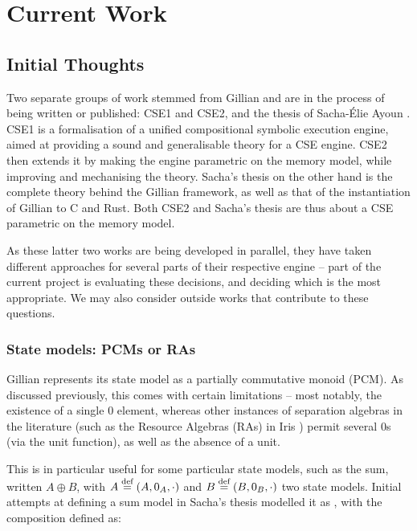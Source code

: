 \chapter{Current Work}

\section{Initial Thoughts}
\label{sec:initial-thoughts}

Two separate groups of work stemmed from Gillian \cite{gillian0, gillian1, gillian2} and are in the process of being written or published: CSE1 \cite{cse1} and CSE2, and the thesis of Sacha-Élie Ayoun \cite{sacha-phd}. CSE1 is a formalisation of a unified compositional symbolic execution engine, aimed at providing a sound and generalisable theory for a CSE engine. CSE2 then extends it by making the engine parametric on the memory model, while improving and mechanising the theory. Sacha's thesis on the other hand is the complete theory behind the Gillian framework, as well as that of the instantiation of Gillian to C and Rust. Both CSE2 and Sacha's thesis are thus about a CSE parametric on the memory model.

As these latter two works are being developed in parallel, they have taken different approaches for several parts of their respective engine -- part of the current project is evaluating these decisions, and deciding which is the most appropriate. We may also consider outside works that contribute to these questions.

\subsection{State models: PCMs or RAs}
\label{sec:thoughts-state-models}

Gillian represents its state model as a partially commutative monoid (PCM). As discussed previously, this comes with certain limitations -- most notably, the existence of a single $0$ element, whereas other instances of separation algebras in the literature (such as the Resource Algebras (RAs) in Iris \cite{iris}) permit several $0$s (via the unit function), as well as the absence of a unit.

This is in particular useful for some particular state models, such as the sum, written $A \oplus B$, with $A\stackrel{\textnormal{def}}=(A,0_A,\cdot)$ and $B\stackrel{\textnormal{def}}=(B,0_B,\cdot)$ two state models. Initial attempts at defining a sum model in Sacha's thesis modelled it as , with the composition defined as:

